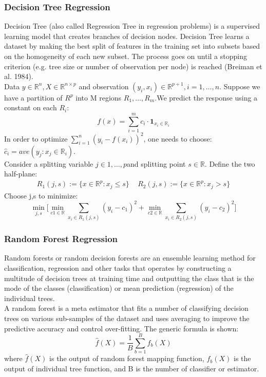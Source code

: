 \documentclass[english]{article}
\begin{document}
\subsubsection{Decision Tree Regression}
Decision Tree \cite{Dom} (also called Regression Tree in regression problems) is a supervised learning model that creates branches of decision nodes. Decision Tree learns a dataset by making the best split of features in the training set into subsets based on the homogeneity of each new subset. The process goes on until a stopping criterion (e.g. tree size or number of observation per node) is reached (Breiman et al. 1984).\\
Data $y \in \mathbb{R}^{n}, X \in \mathbb{R}^{n\times p}$ and observation $(y_{i},x_{i}) \in \mathbb{R}^{p+1}, i = 1,\ldots,n.$
Suppose we have a partition of $R^{p}$ into M regions $R_{1}, \ldots, R_{m}$.We predict the response using a constant on each $R_{i}$:
\begin{equation}
f(x) = \sum_{i=1}^{m}c_{i}\cdot \textbf{1}_{x_{i} \in \mathbb{R}_{i}}
\end{equation}
In order to optimize $\sum_{i=1}^{n}(y_{i} - f(x_{i}))^2$, one needs to choose: $\hat{c}_{i} = ave(y_{j}: x_{j} \in \mathbb{R}_{i})$.\\
Consider a splitting variable $j \in {1, \ldots, p} $and splitting point $s \in \mathbb{R}$. Define the two half-plane:
\begin{align*}
R_{1}(j,s) := \{x \in \mathbb{R}^{p}: x_{j} \leq s\} \, \, \, \, \, \, \,
R_{2}(j,s) := \{x \in \mathbb{R}^{p}: x_{j} > s\}
\end{align*}
Choose j,s to minimize:
\begin{equation}
\min_{j,s} \Bigg[\min_{c1 \in \mathbb{R}} \sum_{x_{i} \in R_{1}(j,s)} (y_{i} - c_{1})^2 + \min_{c2 \in \mathbb{R}} \sum_{x_{i} \in R_{2}(j,s)} (y_{i} - c_{2})^2\Bigg]
\end{equation}
\subsubsection{Random Forest Regression}
Random forests or random decision forests are an ensemble learning method for classification, regression and other tasks that operates by constructing a multitude of decision trees at training time and outputting the class that is the mode of the classes (classification) or mean prediction (regression) of the individual trees\cite{Ho}.\\
A random forest is a meta estimator that fits a number of classifying decision trees on various sub-samples of the dataset and uses averaging to improve the predictive accuracy and control over-fitting. The generic formula is shown:
\begin{equation}
\hat{f}(X) = \frac{1}{B} \sum_{b=1}^{B} f_{b}(X)
\end{equation}
where $\hat{f}(X)$ is the output of random forest mapping function, $f_{b}(X)$ is the output of individual tree function, and B is the number of classifier or estimator.\cite{Hastie}
\end{document}
